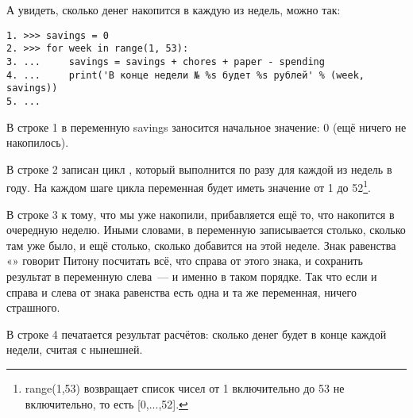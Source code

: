 А увидеть, сколько денег накопится в каждую из недель, можно так:

\begin{listing}
\begin{verbatim}
1. >>> savings = 0
2. >>> for week in range(1, 53):
3. ...     savings = savings + chores + paper - spending
4. ...     print('В конце недели № %s будет %s рублей' % (week, savings))
5. ...
\end{verbatim}
\end{listing}

В строке 1 в переменную savings заносится начальное значение: 0 (ещё ничего не накопилось).

В строке 2 записан цикл , который выполнится по разу для каждой из недель в году. На каждом шаге цикла переменная  будет иметь значение от 1 до 52\footnote{range(1,53) возвращает список чисел от 1 включительно до 53 не включительно, то есть [0,...,52].}.

В строке 3 к тому, что мы уже накопили, прибавляется ещё то, что накопится в очередную неделю. Иными словами, в переменную  записывается столько, сколько там уже было, и ещё столько, сколько добавится на этой неделе. Знак равенства «\code{=}» говорит Питону посчитать всё, что справа от этого знака, и сохранить результат в переменную слева — и именно в таком порядке. Так что если и справа и слева от знака равенства есть одна и та же переменная, ничего страшного.

В строке 4 печатается результат расчётов: сколько денег будет в конце каждой недели, считая с нынешней.

